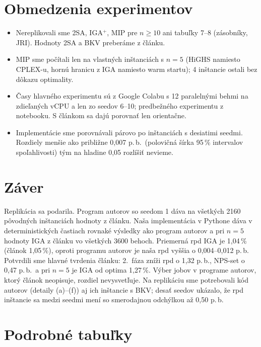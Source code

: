 \documentclass[11pt,a4paper]{article}
\begin{document}
\section{Obmedzenia experimentov}
\begin{itemize}
\item Nereplikovali sme 2SA, IGA$^+$, MIP pre $n\ge 10$ ani tabuľky 7--8 (zásobníky, JRI).
  Hodnoty 2SA a BKV preberáme z článku.
\item MIP sme počítali len na vlastných inštanciách s $n=5$ (HiGHS namiesto CPLEX-u, hornú
  hranicu z IGA namiesto warm startu); 4 inštancie ostali bez dôkazu optimality.
\item Časy hlavného experimentu sú z Google Colabu s 12 paralelnými behmi na zdieľaných vCPU
  a len zo seedov 6--10; predbežného experimentu z notebooku. S článkom sa dajú porovnať len
  orientačne.
\item Implementácie sme porovnávali párovo po inštanciách s desiatimi seedmi. Rozdiely menšie
  ako približne 0,007 p.\,b.\ (polovičná šírka 95\,\% intervalov spoľahlivosti) tým na hladine
  0,05 rozlíšiť nevieme.
\end{itemize}

\section{Záver}
Replikácia sa podarila. Program autorov so seedom 1 dáva na všetkých 2160 pôvodných
inštanciách hodnoty z článku. Naša implementácia v Pythone dáva v deterministických častiach
rovnaké výsledky ako program autorov a pri $n=5$ hodnoty IGA z článku vo všetkých 3600 behoch.
Priemerná rpd IGA je 1,04\,\% (článok 1,05\,\%), oproti programu autorov je naša rpd vyššia
o 0,004--0,012 p.\,b. Potvrdili sme hlavné tvrdenia článku: 2.~fáza zníži rpd o 1,32 p.\,b.,
NPS-set o 0,47 p.\,b.\ a pri $n=5$ je IGA od optima 1,27\,\%. Výber jobov v programe autorov,
ktorý článok neopisuje, rozdiel nevysvetľuje. Na replikáciu sme potrebovali kód autorov
(detaily (a)--(f)) aj ich inštancie s BKV; desať seedov ukázalo, že rpd inštancie sa medzi
seedmi mení so smerodajnou odchýlkou až 0,50 p.\,b.




\newpage
\appendix
\section{Podrobné tabuľky}





\end{document}
